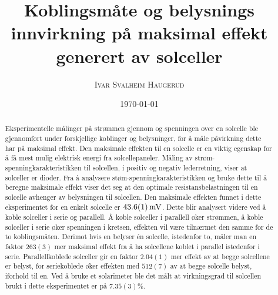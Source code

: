 \documentclass[%
 reprint,
 amsmath,amssymb,
 aps,
 norsk,
 booktabs
]{revtex4-1}
\begin{document}
\title{Koblingsmåte og belysnings innvirkning på maksimal effekt generert av solceller}
\author{\textsc{Ivar Svalheim Haugerud}}
\date{\today}

\begin{abstract}
Eksperimentelle målinger på strømmen gjennom og spenningen over en solcelle ble gjennomført under forskjellige koblinger og belysninger, for å måle påvirkning dette har på maksimal effekt. Den maksimale effekten til en solcelle er en viktig egenskap for å få mest mulig elektrisk energi fra solcellepaneler. Måling av strøm-spenningkarakteristikken til solcellen, i positiv og negativ lederretning, viser at solceller er dioder. Fra å analysere støm-spenningkarakteristikken og bruke dette til å beregne maksimale effekt viser det seg at den optimale resistansbelastningen til en solcelle avhenger av belysningen til solcellen. Den maksimale effekten funnet i dette eksperimentet for en enkelt solcelle er $\SI{43.6\pm0.1}{\milli\volt}$. Dette blir analysert videre ved å koble solceller i serie og parallell. Å koble solceller i parallell øker strømmen, å koble solceller i serie øker spenningen i kretsen, effekten vil være tilnærmet den samme for de to koblingsmåten. Derimot hvis en belyser én solcelle, istedenfor to, måler man en faktor $263(3)$ mer maksimal effekt fra å ha solcellene koblet i parallel istedenfor i serie. Parallellkoblede solceller gir en faktor $2.04(1)$ mer effekt av at begge solcellene er belyst, for seriekoblede øker effekten med $512(7)$ av at begge solcelle belyst, iforhold til en. Ved å bruke et solarimeter ble det målt at virkningsgrad til solcellen brukt i dette eksperimentet er på $7.35(3)\%$.
\end{abstract}

\maketitle

\end{document}
